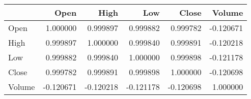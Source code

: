 \begin{tabular}{lrrrrr}
\toprule
 & Open & High & Low & Close & Volume \\
\midrule
Open & 1.000000 & 0.999897 & 0.999882 & 0.999782 & -0.120671 \\
High & 0.999897 & 1.000000 & 0.999840 & 0.999891 & -0.120218 \\
Low & 0.999882 & 0.999840 & 1.000000 & 0.999898 & -0.121178 \\
Close & 0.999782 & 0.999891 & 0.999898 & 1.000000 & -0.120698 \\
Volume & -0.120671 & -0.120218 & -0.121178 & -0.120698 & 1.000000 \\
\bottomrule
\end{tabular}
